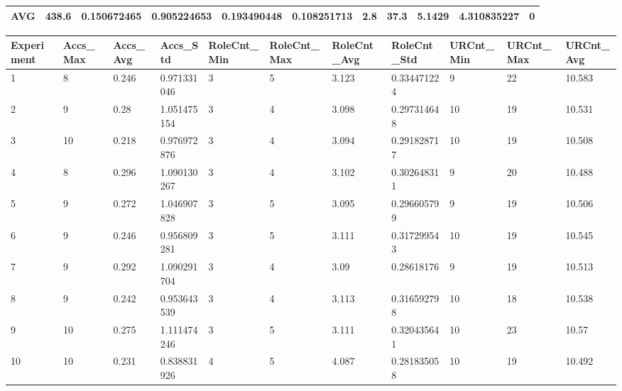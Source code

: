 \begin{table}[H]
\begin{adjustbox}{max width=380pt,keepaspectratio,angle=90}
\begin{tabular}{|l|l|l|l|l|l|l|l|l|l|l|}
					AVG        & 438.6 & 0.150672465  & 0.905224653  & 0.193490448  & 0.108251713  & 2.8       & 37.3      & 5.1429    & 4.310835227 & 0         \\ \hline
				\end{tabular}
			\end{adjustbox}
			\begin{adjustbox}{max width=380pt,keepaspectratio,angle=90}
				\begin{tabular}{|l|l|l|l|l|l|l|l|l|l|l|}
					\rowcolor[HTML]{EFEFEF} 
					\hline
					Experiment & Accs\_Max & Accs\_Avg & Accs\_Std   & RoleCnt\_Min & RoleCnt\_Max & RoleCnt\_Avg & RoleCnt\_Std & URCnt\_Min & URCnt\_Max & URCnt\_Avg \\ \hline
					1          & 8         & 0.246     & 0.971331046 & 3            & 5            & 3.123        & 0.334471224  & 9          & 22         & 10.583     \\ \hline
					2          & 9         & 0.28      & 1.051475154 & 3            & 4            & 3.098        & 0.297314648  & 10         & 19         & 10.531     \\ \hline
					3          & 10        & 0.218     & 0.976972876 & 3            & 4            & 3.094        & 0.291828717  & 10         & 19         & 10.508     \\ \hline
					4          & 8         & 0.296     & 1.090130267 & 3            & 4            & 3.102        & 0.302648311  & 9          & 20         & 10.488     \\ \hline
					5          & 9         & 0.272     & 1.046907828 & 3            & 5            & 3.095        & 0.296605799  & 9          & 19         & 10.506     \\ \hline
					6          & 9         & 0.246     & 0.956809281 & 3            & 5            & 3.111        & 0.317299543  & 10         & 19         & 10.545     \\ \hline
					7          & 9         & 0.292     & 1.090291704 & 3            & 4            & 3.09         & 0.28618176   & 9          & 19         & 10.513     \\ \hline
					8          & 9         & 0.242     & 0.953643539 & 3            & 4            & 3.113        & 0.316592798  & 10         & 18         & 10.538     \\ \hline
					9          & 10        & 0.275     & 1.111474246 & 3            & 5            & 3.111        & 0.320435641  & 10         & 23         & 10.57      \\ \hline
					10         & 10        & 0.231     & 0.838831926 & 4            & 5            & 4.087        & 0.281835058  & 10         & 19         & 10.492     \\ \hline\hline

\end{tabular}
\end{adjustbox}
\end{table}
